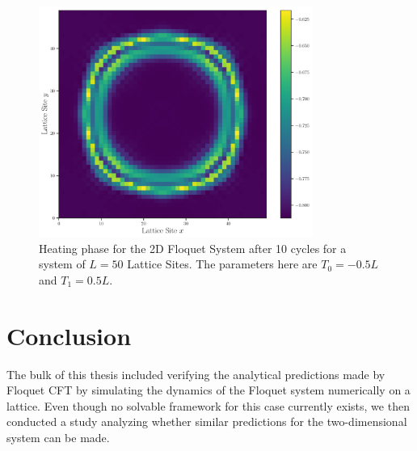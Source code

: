 \documentclass[11pt, a4paper, oneside]{book}
\theoremstyle{definition} %
\begin{document}
\begin{figure}[h]
\centering
\includegraphics[width=0.8\textwidth]{Energydensity2d_nearest.pdf}	
\caption{Heating phase for the 2D Floquet System after 10 cycles for a system of $L = 50$ Lattice Sites. The parameters here are $T_0 = -0.5L$ and $T_1 = 0.5L$.}
\label{fig:Energy_density2d-1}
\end{figure}





\chapter{Conclusion}
The bulk of this thesis included verifying the analytical predictions made by Floquet CFT by simulating the dynamics of the Floquet system numerically on a lattice. Even though no solvable framework for this case currently exists, we then conducted a study analyzing whether similar predictions for the two-dimensional system can be made. \\
\end{document}
